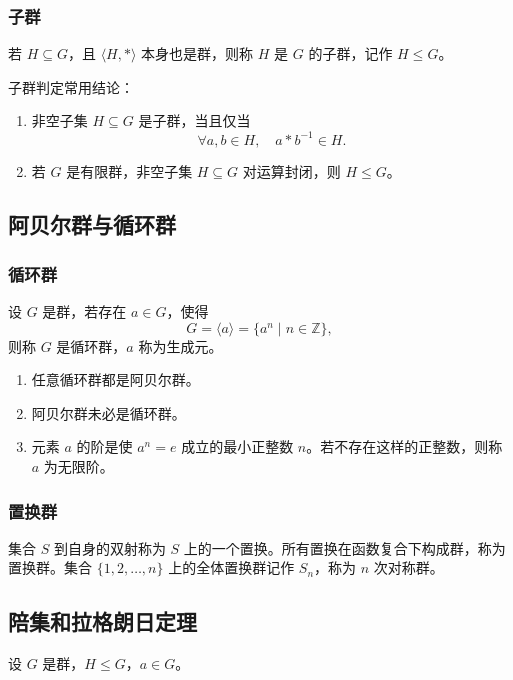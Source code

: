 \subsubsection{子群}

若 \(H\subseteq G\)，且 \(\langle H,*\rangle\) 本身也是群，则称 \(H\) 是 \(G\) 的子群，记作 \(H\le G\)。

子群判定常用结论：
\begin{enumerate}
	\item 非空子集 \(H\subseteq G\) 是子群，当且仅当
	\[
	\forall a,b\in H,\quad a*b^{-1}\in H.
	\]
	\item 若 \(G\) 是有限群，非空子集 \(H\subseteq G\) 对运算封闭，则 \(H\le G\)。
\end{enumerate}

\subsection{阿贝尔群与循环群}

\subsubsection{循环群}

设 \(G\) 是群，若存在 \(a\in G\)，使得
\[
G=\langle a\rangle=\{a^n\mid n\in\mathbb{Z}\},
\]
则称 \(G\) 是循环群，\(a\) 称为生成元。

\begin{enumerate}
	\item 任意循环群都是阿贝尔群。
	\item 阿贝尔群未必是循环群。
	\item 元素 \(a\) 的阶是使 \(a^n=e\) 成立的最小正整数 \(n\)。若不存在这样的正整数，则称 \(a\) 为无限阶。
\end{enumerate}

\subsubsection{置换群}

集合 \(S\) 到自身的双射称为 \(S\) 上的一个置换。所有置换在函数复合下构成群，称为置换群。集合 \(\{1,2,\dots,n\}\) 上的全体置换群记作 \(S_n\)，称为 \(n\) 次对称群。

\subsection{陪集和拉格朗日定理}

设 \(G\) 是群，\(H\le G\)，\(a\in G\)。

